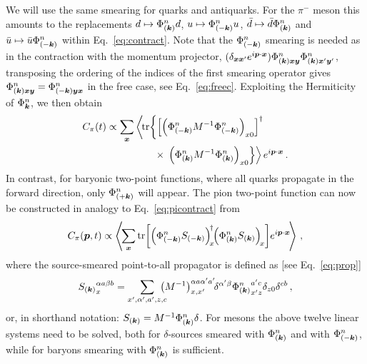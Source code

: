 We will use the same smearing for quarks and
antiquarks. For the $\pi^-$ meson this amounts to the replacements
$d\mapsto \Phi^n_{(\boldsymbol{k})}d$,
$u\mapsto \Phi^n_{(-\boldsymbol{k})}u$, $\bar{d}\mapsto \bar{d}\Phi^n_{(\boldsymbol{k})}$
and $\bar{u}\mapsto \bar{u}\Phi^n_{(-\boldsymbol{k})}$
within Eq.~\eqref{eq:contract}. Note that the $\Phi^n_{(-\boldsymbol{k})}$ smearing is needed
as in the contraction
with the momentum projector, $(\delta_{\boldsymbol{x}\boldsymbol{x}'}e^{i\boldsymbol{p}\cdot\boldsymbol{x}})
\Phi^n_{(\boldsymbol{k})\boldsymbol{x}\boldsymbol{y}}\Phi^n_{(\boldsymbol{k})\boldsymbol{x}'\boldsymbol{y}'}$,
transposing the ordering of the indices of the first smearing operator
gives $\Phi^n_{(\boldsymbol{k})\boldsymbol{x}\boldsymbol{y}}=\Phi^n_{(-\boldsymbol{k})\boldsymbol{y}\boldsymbol{x}}$
in the free case,
see Eq.~\eqref{eq:freec}.
Exploiting the Hermiticity of $\Phi^n_{\boldsymbol{k}}$, we then obtain
\begin{align}
C_{\pi}(t)
\propto\sum_{\boldsymbol{x}}&\left\langle\!\mathop{\textmd{tr}}\nolimits\!\left\{\left[\left(\Phi^n_{(-\boldsymbol{k})}M^{-1}\Phi^n_{(-\boldsymbol{k})}\right)_{x0}\right]^{\dagger}\right.\right.\nonumber\\
&\qquad\times\left.\left.\left(\Phi^n_{(\boldsymbol{k})}M^{-1}\Phi^n_{(\boldsymbol{k})}\right)_{x0}
\right\}\right\rangle e^{i \boldsymbol{p}\cdot\boldsymbol{x}}\,.
\end{align}
In contrast, for baryonic two-point functions, where
all quarks propagate in the forward direction, only $\Phi^n_{(+\boldsymbol{k})}$
will appear. 
The pion two-point function can now be constructed in analogy
to Eq.~\eqref{eq:picontract} from
\begin{equation}
C_{\pi}(\vect{p},t)\propto\left\langle\!\sum_{\vect{x}}\tr\!\left[
\left(\Phi^n_{(-\vect{k})}S_{(-\vect{k})}\right)^{\!\dagger}_{\!x}\!\!\left(
\Phi^n_{(\vect{k})}S_{(\vect{k})}\right)_{\!x}\right]\!e^{i\vect{p}\cdot\vect{x}}\!
\right\rangle\,,
\end{equation}
where the source-smeared
point-to-all propagator is defined as [see Eq.~\eqref{eq:prop}]
\begin{equation}
{S_{(\ensuremath{\boldsymbol{k}})}}^{\alpha a \beta  b}_x=
\sum_{x',\alpha',a',z,c}\!\!\!\!\!\left(M^{-1}\right)^{\alpha a\alpha' a'}_{x,x'}\!\!\delta^{\alpha'\beta}
{\Phi^n_{(\boldsymbol{k})}}_{x'z}^{a'c}
\delta_{z0}\delta^{cb}\,,
\end{equation}
or, in shorthand notation: $S_{(\boldsymbol{k})}=M^{-1}\Phi_{(\boldsymbol{k})}^n\delta$.
For mesons the above twelve linear systems need to be solved, both for
$\delta$-sources smeared with $\Phi_{(\boldsymbol{k})}^n$ and
with $\Phi_{(-\boldsymbol{k})}^n$, while for baryons smearing with
$\Phi_{(\boldsymbol{k})}^n$ is sufficient.

